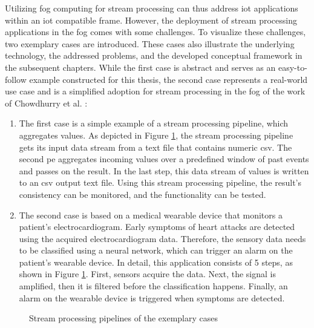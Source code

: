 Utilizing fog computing for stream processing can thus address \gls{iot} applications within an \gls{iot} compatible frame. However, the deployment of stream processing applications in the fog comes with some challenges. To visualize these challenges, two exemplary cases are introduced. These cases also illustrate the underlying technology, the addressed problems, and the developed conceptual framework in the subsequent chapters. While the first case is abstract and serves as an easy-to-follow example constructed for this thesis, the second case represents a real-world use case and is a simplified adoption for stream processing in the fog of the work of Chowdhurry et al. \cite{Chowdhury.2019}:\par

\begin{enumerate}[label=Case \arabic* , wide=0.5em,  leftmargin=*]
    \item \label{cAggregation} The first case is a simple example of a stream processing pipeline, which aggregates values. As depicted in Figure \ref{fExemplaryCases}, the stream processing pipeline gets its input data stream from a text file that contains numeric \gls{csv}. The second \gls{pe} aggregates incoming values over a predefined window of past events and passes on the result. In the last step, this data stream of values is written to an \gls{csv} output text file. Using this stream processing pipeline, the result's consistency can be monitored, and the functionality can be tested.
    \item \label{cMedical} The second case is based on a medical wearable device that monitors a patient’s electrocardiogram. Early symptoms of heart attacks are detected using the acquired electrocardiogram data. Therefore, the sensory data needs to be classified using a neural network, which can trigger an alarm on the patient’s wearable device. In detail, this application consists of 5 steps, as shown in Figure \ref{fExemplaryCases}. First, sensors acquire the data. Next, the signal is amplified, then it is filtered before the classification happens. Finally, an alarm on the wearable device is triggered when symptoms are detected.
\end{enumerate}

\begin{figure}[H]
\graphicspath{{./figures/code/}}

\caption{Stream processing pipelines of the exemplary cases}
\label{fExemplaryCases}
\end{figure}


